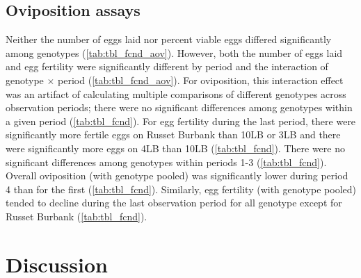 \documentclass{UIdahoMastersThesis}
\begin{document}
\section{Oviposition assays}
\label{sec:results_fecund}
Neither the number of eggs laid nor percent viable eggs differed significantly among genotypes (\autoref{tab:tbl_fcnd_aov}). However, both the number of eggs laid and egg fertility were significantly different by period and the interaction of genotype $\times$ period (\autoref{tab:tbl_fcnd_aov}). For oviposition, this interaction effect was an artifact of calculating multiple comparisons of different genotypes across observation periods; there were no significant differences among genotypes within a given period (\autoref{tab:tbl_fcnd}). For egg fertility during the last period, there were significantly more fertile eggs on Russet Burbank than 10LB or 3LB and there were significantly more eggs on 4LB than 10LB (\autoref{tab:tbl_fcnd}). There were no significant differences among genotypes within periods 1-3 (\autoref{tab:tbl_fcnd}). 
Overall oviposition (with genotype pooled) was significantly lower during period 4 than for the first (\autoref{tab:tbl_fcnd}). Similarly, egg fertility (with genotype pooled) tended to decline during the last observation period for all genotype except for Russet Burbank (\autoref{tab:tbl_fcnd}).

\clearpage
\chapter{Discussion}
\label{ch:discuss}
\end{document}
